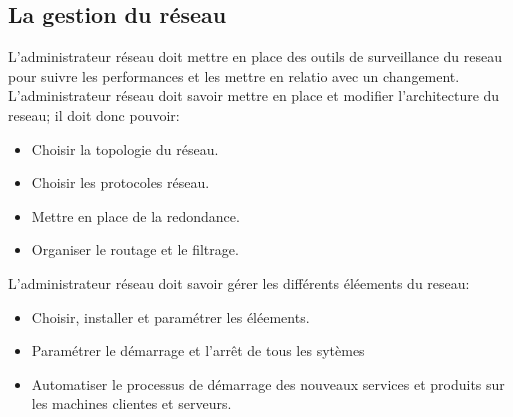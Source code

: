 \documentclass[10pt,a4paper]{article}
\begin{document}
 \subsection{La gestion du réseau}
 L'administrateur réseau doit mettre en place des outils de surveillance du reseau pour suivre les performances et les mettre en relatio avec un changement.\\
 L'administrateur réseau doit savoir mettre en place et modifier l'architecture du reseau; il doit donc pouvoir:
 \begin{itemize}
	 \item Choisir la topologie du réseau.
	 \item Choisir les protocoles réseau.
	 \item Mettre en place de la redondance.
	 \item Organiser le routage et le filtrage.
 \end{itemize}
 L'administrateur réseau doit savoir gérer les différents éléements du reseau:
 \begin{itemize}
	 \item Choisir, installer et paramétrer les éléements.
	 \item Paramétrer le démarrage et l'arrêt de tous les sytèmes
	 \item Automatiser le processus de démarrage des nouveaux services et produits sur les machines clientes et serveurs.
 \end{itemize}
\end{document}
